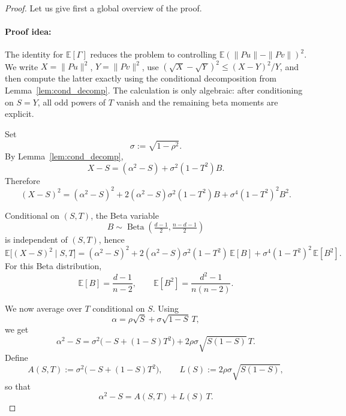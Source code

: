 \documentclass{article}
\DeclareMathOperator{\BetaDist}{Beta}
\begin{document}
\begin{proof}
Let us give first a global overview of the proof.
\paragraph{Proof idea:}
The identity for \(\mathbb E[\Gamma]\) reduces the problem to controlling
\(\mathbb E(\|Pu\|-\|Pv\|)^2\). We write
\(X=\|Pu\|^2\), \(Y=\|Pv\|^2\), use
\((\sqrt X-\sqrt Y)^2\le (X-Y)^2/Y\), and then compute the latter exactly using
the conditional decomposition from Lemma~\ref{lem:cond_decomp}. The calculation
is only algebraic: after conditioning on \(S=Y\), all odd powers of \(T\)
vanish and the remaining beta moments are explicit.



Set
\[
\sigma:=\sqrt{1-\rho^2}.
\]
By Lemma~\ref{lem:cond_decomp},
\begin{equation}
X-S=(\alpha^2-S)+\sigma^2(1-T^2)B.
\label{eq:Delta_split_corrected}
\end{equation}
Therefore
\begin{equation}
(X-S)^2
=
(\alpha^2-S)^2
+
2(\alpha^2-S)\sigma^2(1-T^2)B
+
\sigma^4(1-T^2)^2B^2.
\label{eq:expand_square_corrected}
\end{equation}

Conditional on $(S,T)$, the Beta variable
\[
B\sim \BetaDist\!\left(\tfrac{d-1}{2},\tfrac{n-d-1}{2}\right)
\]
is independent of $(S,T)$, hence
\begin{equation}
\mathbb E\big[(X-S)^2\mid S,T\big]
=
(\alpha^2-S)^2
+
2(\alpha^2-S)\sigma^2(1-T^2)\,\mathbb E[B]
+
\sigma^4(1-T^2)^2\,\mathbb E[B^2].
\label{eq:cond_second_moment_corrected}
\end{equation}
For this Beta distribution,
\begin{equation}
\mathbb E[B]=\frac{d-1}{n-2},
\qquad
\mathbb E[B^2]=\frac{d^2-1}{n(n-2)}.
\label{eq:B_moments_corrected}
\end{equation}

We now average over $T$ conditional on $S$.
Using
\[
\alpha=\rho\sqrt S+\sigma\sqrt{1-S}\,T,
\]
we get
\begin{equation}
\alpha^2-S
=
\sigma^2\bigl(-S+(1-S)T^2\bigr)
+
2\rho\sigma\sqrt{S(1-S)}\,T.
\label{eq:alpha2_minus_S_corrected}
\end{equation}
Define
\[
A(S,T):=\sigma^2\bigl(-S+(1-S)T^2\bigr),
\qquad
L(S):=2\rho\sigma\sqrt{S(1-S)},
\]
so that
\[
\alpha^2-S=A(S,T)+L(S)\,T.
\]


\end{proof}
\end{document}

